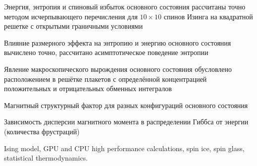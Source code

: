 \documentclass[utf8, babel, sor, jor, amsmath, amssymb, reprint]{elsarticle} %
\begin{document}
\begin{frontmatter}
\begin{abstract}
\end{abstract}


\begin{highlights}
	\item Энергия, энтропия и спиновый избыток основного состояния рассчитаны точно методом исчерпывающего перечисления для $10 \times 10$ спинов Изинга на квадратной решетке с открытыми граничными условиями
	\item Влияние размерного эффекта на энтропию и энергию основного состояния вычислено точно, рассчитано асимптотическое поведение энтропии
	\item Явление макроскопического вырождения основного состояния обусловлено расположением в решётке плакетов с определённой концентрацией положительных и отрицательных обменных интегралов
	\item Магнитный структурный фактор для разных конфигураций основного состояния
	\item Зависимость дисперсии магнитного момента в распределении Гиббса от энергии (количества фрустраций)
\end{highlights}


\begin{keyword}
	Ising model, GPU and CPU high performance calculations, spin ice, spin glass, statistical thermodynamics.
\end{keyword}


\end{frontmatter}
\end{document}
